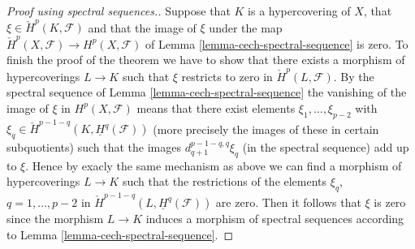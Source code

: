 \begin{proof}[Proof using spectral sequences.]
\medskip\noindent
Suppose that $K$ is a hypercovering of $X$, that
$\xi \in \check{H}^p(K, \mathcal{F})$ and that the image of
$\xi$ under the map
$\check{H}^p(X, \mathcal{F}) \to H^p(X, \mathcal{F})$ of
Lemma \ref{lemma-cech-spectral-sequence}
is zero. To finish the proof of the theorem we have to show that
there exists a morphism of hypercoverings $L \to K$ such that
$\xi$ restricts to zero in $\check{H}^p(L, \mathcal{F})$.
By the spectral sequence of Lemma \ref{lemma-cech-spectral-sequence}
the vanishing of the image of $\xi$ in $H^p(X, \mathcal{F})$
means that there exist elements $\xi_1, \ldots, \xi_{p - 2}$
with $\xi_q \in \check{H}^{p - 1 - q}(K, \underline{H}^q(\mathcal{F}))$
(more precisely the images of these in certain subquotients)
such that the images $d_{q + 1}^{p - 1 - q, q}\xi_q$ (in the spectral
sequence) add up to $\xi$. Hence by exacly the same mechanism as above
we can find a morphism of hypercoverings $L \to K$ such that
the restrictions of the elements $\xi_q$, $q = 1, \ldots, p - 2$
in $\check{H}^{p - 1 - q}(L, \underline{H}^q(\mathcal{F}))$ are zero.
Then it follows that $\xi$ is zero since the morphism $L \to K$
induces a morphism of spectral sequences according to
Lemma \ref{lemma-cech-spectral-sequence}.
\end{proof}

